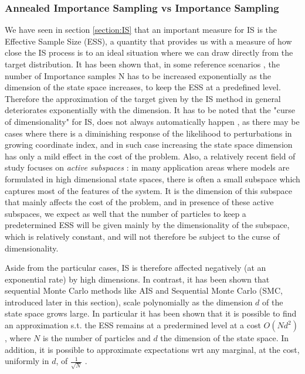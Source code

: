 \documentclass[12pt,mythesisstyle]{report}
\begin{document}
\subsubsection{Annealed Importance Sampling vs Importance Sampling}
We have seen in section \ref{section:IS} that an important measure for IS is the Effective Sample Size (ESS), a quantity that provides us with a measure of how close the IS process is to an ideal situation where we can draw directly from the target distribution. It has been shown that, in some reference scenarios \cite{IS_cost}, the number of Importance samples N has to be increased exponentially as the dimension of the state space increases, to keep the ESS at a predefined level. Therefore the approximation of the target given by the IS method in general deteriorates exponentially with the dimension. It has to be noted that the "curse of dimensionality" for IS, does not always automatically happen \cite{IS_cost}, as there may be cases where there is a diminishing response of the likelihood to perturbations in growing coordinate index, and in such case increasing the state space dimension has only a mild effect in the cost of the problem. Also, a relatively recent field of study focuses on \textit{active subspaces} \cite{IS_cost}: 
 in many application areas where models are formulated in high dimensional state spaces, there is often a small subspace which captures most of the features of the system. It is the dimension of this subspace that mainly affects the cost of the problem, and in presence of these active subspaces, we expect as well that the number of particles to keep a predetermined ESS will be given mainly by the dimensionality of the subspace, which is relatively constant, and will not therefore be subject to the curse of dimensionality.

Aside from the particular cases, IS is therefore affected negatively (at an exponential rate) by high dimensions. In contrast, it has been shown that \cite{crisan1} \cite{crisan2} sequential Monte Carlo methods like AIS and Sequential Monte Carlo (SMC, introduced later in this section), scale polynomially as the dimension $d$ of the state space grows large. In particular it has been shown \cite{crisan1} \cite{crisan2} that it is possible to find an approximation s.t. the ESS remains at a predermined level at a cost $O(Nd^2)$, where $N$ is the number of particles and $d$ the dimension of the state space. In addition, it is possible to approximate expectations wrt any marginal, at the cost, uniformly in $d$, of $\frac{1}{\sqrt{N}}$ \cite{crisan1} \cite{crisan2}.
\end{document}
